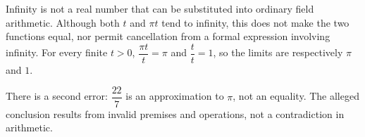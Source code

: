 Infinity is not a real number that can be substituted into ordinary field arithmetic. Although both $t$ and $\pi t$ tend to infinity, this does not make the two functions equal, nor permit cancellation from a formal expression involving infinity. For every finite $t>0$, $\dfrac{\pi t}{t}=\pi$ and $\dfrac{t}{t}=1$, so the limits are respectively $\boxed{\pi}$ and $\boxed1$.

There is a second error: $\dfrac{22}{7}$ is an approximation to $\pi$, not an equality. The alleged conclusion results from invalid premises and operations, not a contradiction in arithmetic.
